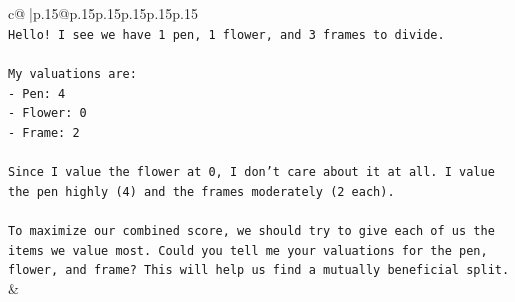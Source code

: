 \documentclass{article}
\begin{document}
{\begin{supertabular}{c@{$\;$}|p{.15\linewidth}@{}p{.15\linewidth}p{.15\linewidth}p{.15\linewidth}p{.15\linewidth}p{.15\linewidth}}
{{{\\ 
\texttt{Hello! I see we have 1 pen, 1 flower, and 3 frames to divide.} \\
\\ 
\texttt{My valuations are:} \\
\texttt{{-} Pen: 4} \\
\texttt{{-} Flower: 0} \\
\texttt{{-} Frame: 2} \\
\\ 
\texttt{Since I value the flower at 0, I don't care about it at all. I value the pen highly (4) and the frames moderately (2 each).} \\
\\ 
\texttt{To maximize our combined score, we should try to give each of us the items we value most. Could you tell me your valuations for the pen, flower, and frame? This will help us find a mutually beneficial split.} \\
            }
        }
    }
    & \\ \\


\end{supertabular}}
\end{document}
